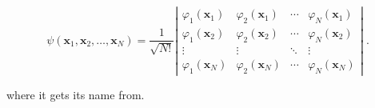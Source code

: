 \begin{equation}\label{eq:slatdif}
    \psi(\mathbf{x}_1, \mathbf{x}_2, \ldots, \mathbf{x}_N)=\dfrac{1}{\sqrt{N!}} \left| \begin{matrix} \varphi_1(\mathbf{x}_1) & \varphi_2(\mathbf{x}_1) & \cdots & \varphi_N(\mathbf{x}_1) \\ \varphi_1(\mathbf{x}_2) & \varphi_2(\mathbf{x}_2) & \cdots & \varphi_N(\mathbf{x}_2) \\ \vdots & \vdots & \ddots & \vdots \\ \varphi_1(\mathbf{x}_N) & \varphi_2(\mathbf{x}_N) & \cdots & \varphi_N(\mathbf{x}_N) \end{matrix} \right| \; .
\end{equation}


where it gets its name from.